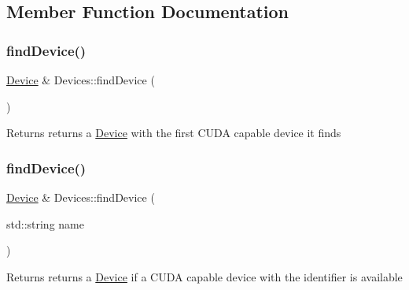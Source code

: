 \subsection{Member Function Documentation}
\mbox{\label{classyacx_1_1_devices_abaae9839d12e79117e2fb292ee0689fb}} 
\subsubsection{\texorpdfstring{find\+Device()}{findDevice()}\hspace{0.1cm}{\footnotesize\ttfamily [1/2]}}
{\footnotesize\ttfamily \hyperlink{classyacx_1_1_device}{Device} \& Devices\+::find\+Device (\begin{DoxyParamCaption}{ }\end{DoxyParamCaption})\hspace{0.3cm}{\ttfamily [static]}}

\begin{DoxyReturn}{Returns}
returns a \hyperlink{classyacx_1_1_device}{Device} with the first C\+U\+DA capable device it finds 
\end{DoxyReturn}
\mbox{\label{classyacx_1_1_devices_a89eb86ce0ad70dd0390375ee04f549f6}} 
\subsubsection{\texorpdfstring{find\+Device()}{findDevice()}\hspace{0.1cm}{\footnotesize\ttfamily [2/2]}}
{\footnotesize\ttfamily \hyperlink{classyacx_1_1_device}{Device} \& Devices\+::find\+Device (\begin{DoxyParamCaption}\item[{std\+::string}]{name }\end{DoxyParamCaption})\hspace{0.3cm}{\ttfamily [static]}}

\begin{DoxyReturn}{Returns}
returns a \hyperlink{classyacx_1_1_device}{Device} if a C\+U\+DA capable device with the identifier is available 
\end{DoxyReturn}

